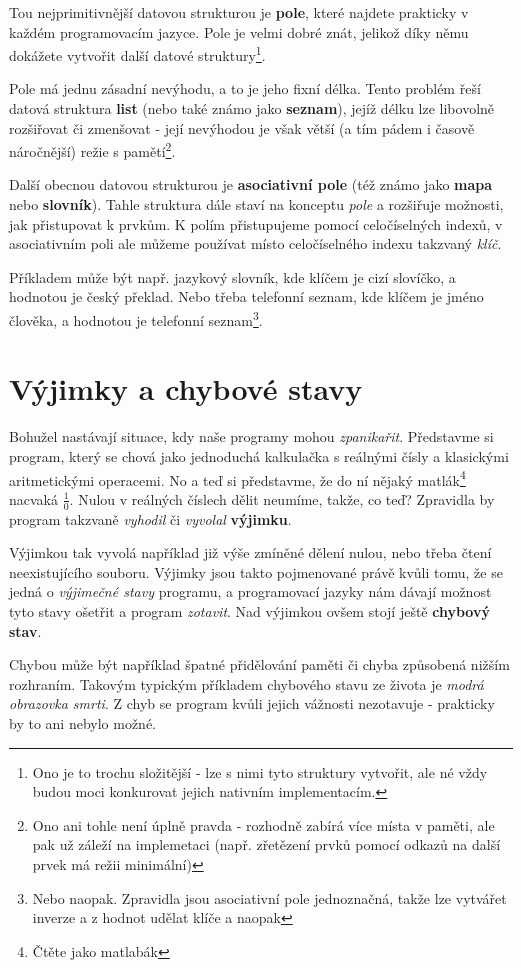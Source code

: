 Tou nejprimitivnější datovou strukturou je \textbf{pole}, které najdete prakticky v každém programovacím jazyce. Pole je velmi dobré znát, jelikož díky němu dokážete vytvořit další datové struktury\footnote{Ono je to trochu složitější - lze s nimi tyto struktury vytvořit, ale né vždy budou moci konkurovat jejich nativním implementacím.}.

Pole má jednu zásadní nevýhodu, a to je jeho fixní délka. Tento problém řeší datová struktura \textbf{list} (nebo také známo jako \textbf{seznam}), jejíž délku lze libovolně rozšiřovat či zmenšovat - její nevýhodou je však větší (a tím pádem i časově náročnější) režie s pamětí\footnote{Ono ani tohle není úplně pravda - rozhodně zabírá více místa v paměti, ale pak už záleží na implemetaci (např. zřetězení prvků pomocí odkazů na další prvek má režii minimální)}.

Další obecnou datovou strukturou je \textbf{asociativní pole} (též známo jako \textbf{mapa} nebo \textbf{slovník}). Tahle struktura dále staví na konceptu \textit{pole} a rozšiřuje možnosti, jak přistupovat k prvkům. K polím přistupujeme pomocí celočíselných indexů, v asociativním poli ale můžeme používat místo celočíselného indexu takzvaný \textit{klíč}. 

Příkladem může být např. jazykový slovník, kde klíčem je cizí slovíčko, a hodnotou je český překlad. Nebo třeba telefonní seznam, kde klíčem je jméno člověka, a hodnotou je telefonní seznam\footnote{Nebo naopak. Zpravidla jsou asociativní pole jednoznačná, takže lze vytvářet inverze a z hodnot udělat klíče a naopak}.

\section{Výjimky a chybové stavy}
Bohužel nastávají situace, kdy naše programy mohou \textit{zpanikařit}. Představme si program, který se chová jako jednoduchá kalkulačka s reálnými čísly a klasickými aritmetickými operacemi. No a teď si představme, že do ní nějaký matlák\footnote{Čtěte jako matlabák} nacvaká $\frac{1}{0}$. Nulou v reálných číslech dělit neumíme, takže, co teď? Zpravidla by program takzvaně \textit{vyhodil} či \textit{vyvolal} \textbf{výjimku}. 

Výjimkou tak vyvolá například již výše zmíněné dělení nulou, nebo třeba čtení neexistujícího souboru. Výjimky jsou takto pojmenované právě kvůli tomu, že se jedná o \textit{výjimečné stavy} programu, a programovací jazyky nám dávají možnost tyto stavy ošetřit a program \textit{zotavit}. Nad výjimkou ovšem stojí ještě \textbf{chybový stav}.

Chybou může být například špatné přidělování paměti či chyba způsobená nižším rozhraním. Takovým typickým příkladem chybového stavu ze života je \textit{modrá obrazovka smrti}. Z chyb se program kvůli jejich vážnosti nezotavuje - prakticky by to ani nebylo možné.